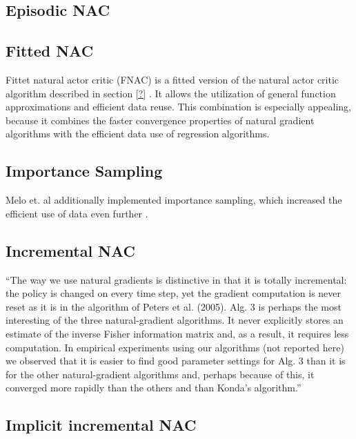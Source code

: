 \subsection{Episodic NAC}

\subsection{Fitted NAC}

Fittet natural actor critic (FNAC) is a fitted version of the natural actor critic algorithm described in section \ref{?} \cite{melo2008fitted}.  It allows the utilization of general function approximations and efficient data reuse. This combination is especially appealing, because it combines the faster convergence properties of natural gradient algorithms with the efficient data use of regression algorithms.

\subsection{Importance Sampling}

Melo et. al additionally implemented importance sampling, which increased the efficient use of data even further \cite{melo2008fitted}.

\subsection{Incremental NAC}

``The way we use natural gradients is distinctive in that it is totally incremental: the policy is changed on every time step, yet the gradient computation is never reset as it is in the algorithm of Peters et al. (2005). Alg. 3 is perhaps the most interesting of the three natural-gradient algorithms. It never explicitly stores an estimate of the inverse Fisher information matrix and, as a result, it requires less computation. In empirical experiments using our algorithms (not reported here) we observed that it is easier to ﬁnd good parameter settings for Alg. 3 than it is for the other natural-gradient algorithms and, perhaps because of this, it converged more rapidly than the others and than Konda’s algorithm.'' \cite{bhatnagar2008incremental}

\subsection{Implicit incremental NAC}




